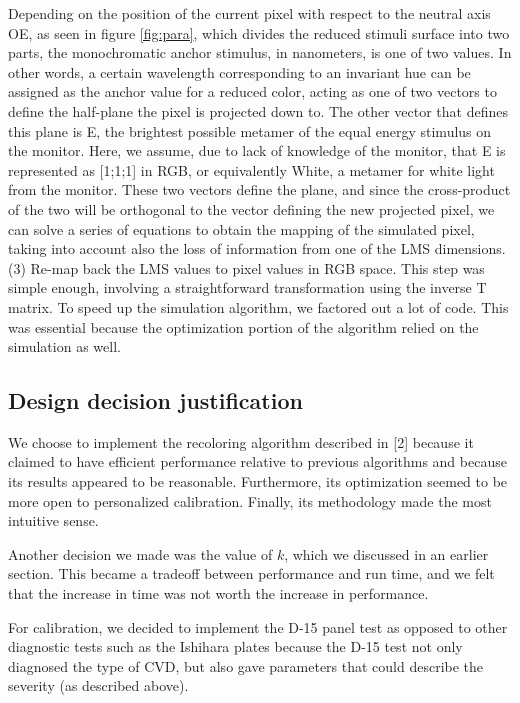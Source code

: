 \documentclass[10pt,twocolumn,letterpaper]{article}
\begin{document}
Depending on the position of the current pixel with respect to the neutral axis OE, as seen in figure \ref{fig:para}, which divides the reduced stimuli surface into two parts, the monochromatic anchor stimulus, in nanometers, is one of two values. In other words, a certain wavelength corresponding to an invariant hue can be assigned as the anchor value for a reduced color, acting as one of two vectors to define the half-plane the pixel is projected down to. The other vector that defines this plane is E, the brightest possible metamer of the equal energy stimulus on the monitor. Here, we assume, due to lack of knowledge of the monitor, that E is represented as [1;1;1] in RGB, or equivalently White, a metamer for white light from the monitor. These two vectors define the plane, and since the cross-product of the two will be orthogonal to the vector defining the new projected pixel, we can solve a series of equations to obtain the mapping of the simulated pixel, taking into account also the loss of information from one of the LMS dimensions. 
(3) 	Re-map back the LMS values to pixel values in RGB space.  This step was simple enough, involving a straightforward transformation using the inverse T matrix. To speed up the simulation algorithm, we factored out a lot of code. This was essential because the optimization portion of the algorithm relied on the simulation as well. 

\subsection{Design decision justification}

We choose to implement the recoloring algorithm described in [2] because it claimed to have efficient performance relative to previous algorithms and because its results appeared to be reasonable. Furthermore, its optimization seemed to be more open to personalized calibration. Finally, its methodology made the most intuitive sense. 

Another decision we made was the value of $k$, which we discussed in an earlier section. This became a tradeoff between performance and run time, and we felt that the increase in time was not worth the increase in performance. 

For calibration, we decided to implement the D-15 panel test as opposed to other diagnostic tests such as the Ishihara plates because the D-15 test not only diagnosed the type of CVD, but also gave parameters that could describe the severity (as described above). 
\end{document}
